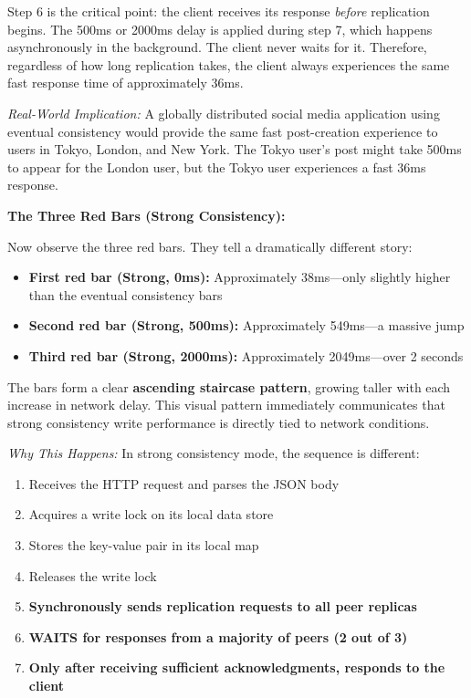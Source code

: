 \documentclass[10pt,a4paper]{article}
\begin{document}
Step 6 is the critical point: the client receives its response \textit{before} replication begins. The 500ms or 2000ms delay is applied during step 7, which happens asynchronously in the background. The client never waits for it. Therefore, regardless of how long replication takes, the client always experiences the same fast response time of approximately 36ms.

\textit{Real-World Implication:} A globally distributed social media application using eventual consistency would provide the same fast post-creation experience to users in Tokyo, London, and New York. The Tokyo user's post might take 500ms to appear for the London user, but the Tokyo user experiences a fast 36ms response.

\textbf{The Three Red Bars (Strong Consistency):}

Now observe the three red bars. They tell a dramatically different story:
\begin{itemize}
    \item \textbf{First red bar (Strong, 0ms):} Approximately 38ms---only slightly higher than the eventual consistency bars
    \item \textbf{Second red bar (Strong, 500ms):} Approximately 549ms---a massive jump
    \item \textbf{Third red bar (Strong, 2000ms):} Approximately 2049ms---over 2 seconds
\end{itemize}

The bars form a clear \textbf{ascending staircase pattern}, growing taller with each increase in network delay. This visual pattern immediately communicates that strong consistency write performance is directly tied to network conditions.

\textit{Why This Happens:} In strong consistency mode, the sequence is different:
\begin{enumerate}
    \item Receives the HTTP request and parses the JSON body
    \item Acquires a write lock on its local data store
    \item Stores the key-value pair in its local map
    \item Releases the write lock
    \item \textbf{Synchronously sends replication requests to all peer replicas}
    \item \textbf{WAITS for responses from a majority of peers (2 out of 3)}
    \item \textbf{Only after receiving sufficient acknowledgments, responds to the client}
\end{enumerate}
\end{document}
